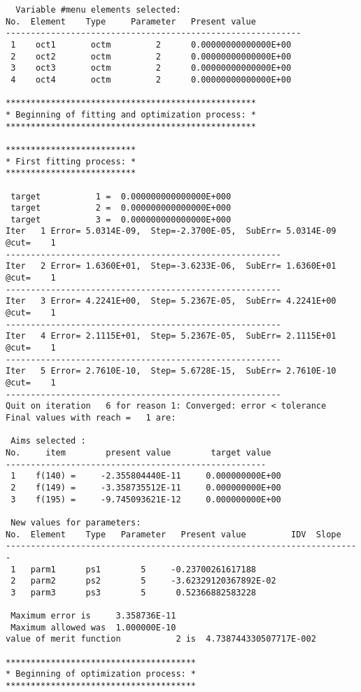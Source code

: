 \begin{footnotesize}
\begin{verbatim}
  Variable #menu elements selected:
No.  Element    Type     Parameter   Present value
-----------------------------------------------------------
 1    oct1       octm         2      0.00000000000000E+00
 2    oct2       octm         2      0.00000000000000E+00
 3    oct3       octm         2      0.00000000000000E+00
 4    oct4       octm         2      0.00000000000000E+00

**************************************************
* Beginning of fitting and optimization process: *
**************************************************

**************************
* First fitting process: *
**************************

 target           1 =  0.000000000000000E+000
 target           2 =  0.000000000000000E+000
 target           3 =  0.000000000000000E+000
Iter   1 Error= 5.0314E-09,  Step=-2.3700E-05,  SubErr= 5.0314E-09 @cut=    1
-------------------------------------------------------
Iter   2 Error= 1.6360E+01,  Step=-3.6233E-06,  SubErr= 1.6360E+01 @cut=    1
-------------------------------------------------------
Iter   3 Error= 4.2241E+00,  Step= 5.2367E-05,  SubErr= 4.2241E+00 @cut=    1
-------------------------------------------------------
Iter   4 Error= 2.1115E+01,  Step= 5.2367E-05,  SubErr= 2.1115E+01 @cut=    1
-------------------------------------------------------
Iter   5 Error= 2.7610E-10,  Step= 5.6728E-15,  SubErr= 2.7610E-10 @cut=    1
-------------------------------------------------------
Quit on iteration   6 for reason 1: Converged: error < tolerance
Final values with reach =   1 are:

 Aims selected :
No.     item        present value        target value
----------------------------------------------------
 1    f(140) =     -2.355804440E-11     0.000000000E+00
 2    f(149) =     -3.358735512E-11     0.000000000E+00
 3    f(195) =     -9.745093621E-12     0.000000000E+00

 New values for parameters:
No.  Element    Type   Parameter   Present value         IDV  Slope
-----------------------------------------------------------------------
 1   parm1      ps1        5     -0.23700261617188
 2   parm2      ps2        5     -3.62329120367892E-02
 3   parm3      ps3        5      0.52366882583228

 Maximum error is     3.358736E-11
 Maximum allowed was  1.000000E-10
value of merit function           2 is  4.738744330507717E-002

**************************************
* Beginning of optimization process: *
**************************************


\end{verbatim}
\end{footnotesize}
